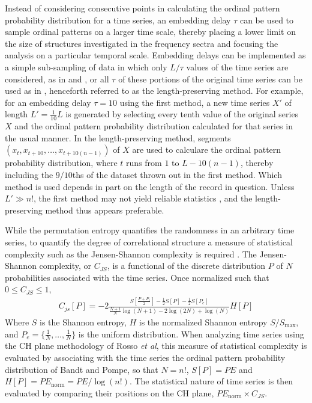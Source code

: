 \documentclass[aps,twocolumn,secnumarabic,nobalancelastpage,amsmath,amssymb,
nofootinbib]{revtex4-1}
\begin{document}
Instead of considering consecutive points in calculating the ordinal pattern probability distribution for a time series, an embedding delay $\tau$ can be used to sample ordinal patterns on a larger time scale, thereby placing a lower limit on the size of structures investigated in the frequency sectra and focusing the analysis on a particular temporal scale. Embedding delays can be implemented as a simple sub-sampling of data in which only $L/\tau$ values of the time series are considered, as in \cite{maggs2013} and \cite{gekelman2014}, or all $\tau$ of these portions of the original time series can be used as in \cite{bandt2005}, henceforth referred to as the length-preserving method. For example, for an embedding delay $\tau=10$ using the first method, a new time series $X'$ of length $L'=\frac{1}{10}L$ is generated by selecting every tenth value of the original series $X$ and the ordinal pattern probability distribution calculated for that series in the usual manner. In the  length-preserving method, segments $ ( x_t,x_{t+10},\ldots,x_{t+10(n-1)} ) $ of $X$ are used to calculare the ordinal pattern probability distribution, where $t$ runs from $1$ to $L-10(n-1)$, thereby including the $9/10$ths of the dataset thrown out in the first method. Which method is used depends in part on the length of the record in question. Unless  $L' \gg n!$, the first method may not yield reliable statistics \cite{gekelman2014}, and the length-preserving method thus appears preferable.


While the permutation entropy quantifies the randomness in an arbitrary time series, to quantify the degree of correlational structure a measure of statistical complexity such as the Jensen-Shannon complexity is required \cite{rosso2007}. The Jensen-Shannon complexity, or $C_{JS}$, is a functional of the discrete distribution $P$ of $N$ probabilities associated with the time series. Once normalized such that $0 \leq C_{JS} \leq 1$, 
\begin{align}
C_{js}[P] = -2\frac{S \left[ \frac{P+P_e}{2} \right] - \frac{1}{2}S[P]-\frac{1}{2}S[P_e] }{\frac{N+1}{N} \log(N+1)-2 \log(2N)+\log(N)}H[P]
\end{align}
Where $S$ is the Shannon entropy, $H$ is the normalized Shannon entropy $S/S_{\text{max}}$, and $P_e=\{\frac{1}{N}, \ldots, \frac{1}{N} \}$ is the uniform distribution. When analyzing time series using the CH plane methodology of Rosso \textit{et al}, this measure of statistical complexity is evaluated by associating with the time series the ordinal pattern probability distribution of Bandt and Pompe, so that $N=n!$, $S[P]=PE$ and $H[P]=PE_{\text{norm}}=PE/\log(n!)$. The statistical nature of time series is then evaluated by comparing their positions on the CH plane, $PE_{\text{norm}} \times C_{JS}$.
\end{document}

